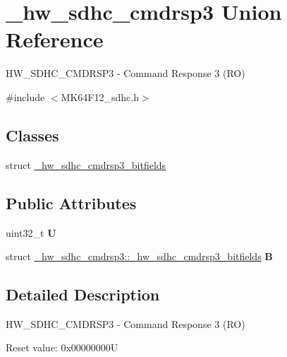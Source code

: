 \hypertarget{union__hw__sdhc__cmdrsp3}{}\section{\+\_\+hw\+\_\+sdhc\+\_\+cmdrsp3 Union Reference}
\label{union__hw__sdhc__cmdrsp3}


H\+W\+\_\+\+S\+D\+H\+C\+\_\+\+C\+M\+D\+R\+S\+P3 -\/ Command Response 3 (RO)  




{\ttfamily \#include $<$M\+K64\+F12\+\_\+sdhc.\+h$>$}

\subsection*{Classes}
\begin{DoxyCompactItemize}
\item 
struct \hyperlink{struct__hw__sdhc__cmdrsp3_1_1__hw__sdhc__cmdrsp3__bitfields}{\+\_\+hw\+\_\+sdhc\+\_\+cmdrsp3\+\_\+bitfields}
\end{DoxyCompactItemize}
\subsection*{Public Attributes}
\begin{DoxyCompactItemize}
\item 
uint32\+\_\+t {\bfseries U}\hypertarget{union__hw__sdhc__cmdrsp3_af72d0930302af9151e8a265bc1314499}{}\label{union__hw__sdhc__cmdrsp3_af72d0930302af9151e8a265bc1314499}

\item 
struct \hyperlink{struct__hw__sdhc__cmdrsp3_1_1__hw__sdhc__cmdrsp3__bitfields}{\+\_\+hw\+\_\+sdhc\+\_\+cmdrsp3\+::\+\_\+hw\+\_\+sdhc\+\_\+cmdrsp3\+\_\+bitfields} {\bfseries B}\hypertarget{union__hw__sdhc__cmdrsp3_ab345b843c33343ab1b4e2aa07f09c0f3}{}\label{union__hw__sdhc__cmdrsp3_ab345b843c33343ab1b4e2aa07f09c0f3}

\end{DoxyCompactItemize}


\subsection{Detailed Description}
H\+W\+\_\+\+S\+D\+H\+C\+\_\+\+C\+M\+D\+R\+S\+P3 -\/ Command Response 3 (RO) 

Reset value\+: 0x00000000U

